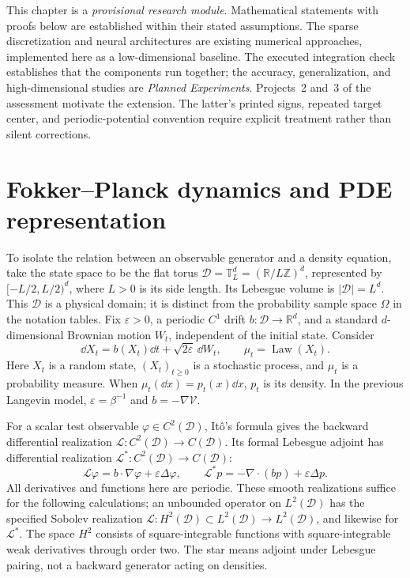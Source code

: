 \documentclass[12pt,a4paper,oneside]{book}
\begin{document}
This chapter is a \emph{provisional research module}. Mathematical statements with proofs below are established within
their stated assumptions. The sparse discretization and neural architectures are existing numerical approaches, implemented
here as a low-dimensional baseline. The executed integration check establishes that the components run together;
the accuracy, generalization, and high-dimensional studies are \emph{Planned Experiments}. Projects~2 and~3 of the
assessment motivate the extension. The latter's printed signs, repeated target center, and periodic-potential convention
require explicit treatment rather than silent corrections.

\section{Fokker--Planck dynamics and PDE representation}
\label{subsec:neural-fp}

To isolate the relation between an observable generator and a density equation, take the state space to be the flat torus
$\mathcal D=\mathbb T_L^d=(\mathbb R/L\mathbb Z)^d$, represented by $[-L/2,L/2)^d$, where $L>0$ is its side length.
Its Lebesgue volume is $|\mathcal D|=L^d$. This $\mathcal D$ is a physical domain; it is distinct from the probability
sample space $\Omega$ in the notation tables. Fix $\varepsilon>0$, a periodic $C^1$ drift $b:\mathcal D\to\mathbb R^d$,
and a standard $d$-dimensional Brownian motion $W_t$, independent of the initial state. Consider
\begin{equation}
 \dd X_t=b(X_t)\dd t+\sqrt{2\varepsilon}\,\dd W_t,
 \qquad \mu_t=\operatorname{Law}(X_t).
 \label{eq:neural-sde}
\end{equation}
Here $X_t$ is a random state, $(X_t)_{t\ge0}$ is a stochastic process, and $\mu_t$ is a probability measure.
When $\mu_t(\dd x)=p_t(x)\dd x$, $p_t$ is its density. In the previous Langevin model,
$\varepsilon=\beta^{-1}$ and $b=-\nabla\mathcal V$.

For a scalar test observable $\varphi\in C^2(\mathcal D)$, It\^o's formula gives the backward differential realization
$\mathcal L:C^2(\mathcal D)\to C(\mathcal D)$. Its formal Lebesgue adjoint has differential realization
$\mathcal L^*:C^2(\mathcal D)\to C(\mathcal D)$:
\begin{equation}
 \mathcal L\varphi=b\cdot\nabla\varphi+\varepsilon\Delta\varphi,
 \qquad \mathcal L^*p=-\nabla\cdot(bp)+\varepsilon\Delta p.
 \label{eq:neural-generators}
\end{equation}
All derivatives and functions here are periodic. These smooth realizations suffice for the following calculations;
an unbounded operator on $L^2(\mathcal D)$ has the specified Sobolev realization
$\mathcal L:H^2(\mathcal D)\subset L^2(\mathcal D)\to L^2(\mathcal D)$, and likewise for $\mathcal L^*$.
The space $H^2$ consists of square-integrable functions with square-integrable weak derivatives through order two.
The star means adjoint under Lebesgue pairing, not a backward generator acting on densities.
\end{document}

